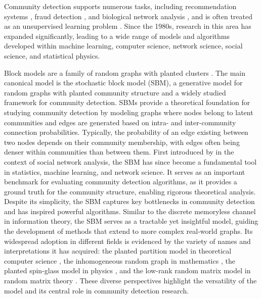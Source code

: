 \documentclass[11pt]{article}
\theoremstyle{plain}
\theoremstyle{definition}
\begin{document}
Community detection supports numerous tasks, including recommendation systems \citep{gasparetti2021community}, fraud detection \citep{sarma2020bank}, and biological network analysis \citep{rahiminejad2019topological}, and is often treated as an unsupervised learning problem \citep{abbe017}.
Since the 1980s, research in this area has expanded significantly, leading to a wide range of models and algorithms developed within machine learning, computer science, network science, social science, and statistical physics.

Block models are a family of random graphs with planted clusters \citep{goldenberg2010survey}. The main canonical model is the stochastic block model (SBM), a generative model for random graphs with planted community structure and a widely studied framework for community detection. SBMs provide a theoretical foundation for studying community detection by modeling graphs where nodes belong to latent communities and edges are generated based on intra- and inter-community connection probabilities. Typically, the probability of an edge existing between two nodes depends on their community membership, with edges often being denser within communities than between them. First introduced by \cite{holland1983stochastic} in the context of social network analysis, the SBM has since become a fundamental tool in statistics, machine learning, and network science. It serves as an important benchmark for evaluating community detection algorithms, as it provides a ground truth for the community structure, enabling rigorous theoretical analysis. Despite its simplicity, the SBM captures key bottlenecks in community detection and has inspired powerful algorithms. Similar to the discrete memoryless channel in information theory, the SBM serves as a tractable yet insightful model, guiding the development of methods that extend to more complex real-world graphs. Its widespread adoption in different fields is evidenced by the variety of names and interpretations it has acquired: the planted partition model in theoretical computer science \citep{mcsherry2001spectral}, the inhomogeneous random graph in mathematics \citep{bollobas2007phase}, the planted spin-glass model in physics \citep{decelle2011asymptotic}, and the low-rank random matrix model in random matrix theory \citep{mcsherry2001spectral}.
These diverse perspectives highlight the versatility of the model and its central role in community detection research.
\end{document}
